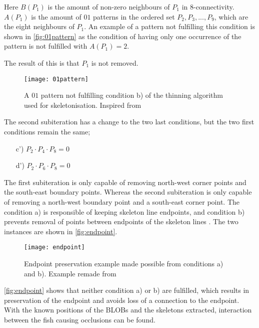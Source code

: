 Here $B(P_1)$ is the amount of non-zero neighbours of $P_1$ in 8-connectivity. $ A(P_1) $ is the amount of $01$ patterns in the ordered set $P_2, P_3, ... , P_9$, which are the eight neighbours of $P_1$. An example of a pattern not fulfilling this condition is shown in \autoref{fig:01pattern} as the condition of having only one occurrence of the pattern is not fulfilled with $A(P_1) = 2$.

The result of this is that $P_1$ is not removed.

\begin{figure}[H]
	\centering
	\texttt{[image: 01pattern]}
	\caption{A $01$ pattern not fulfilling condition b) of the thinning algorithm used for skeletonisation. Inspired from \cite{Zhang1984}}
	\label{fig:01pattern}
\end{figure}

The second subiteration has a change to the two last conditions, but the two first conditions remain the same;

\begin{itemize}
	\item[c')] $ P_2 \cdot P_4 \cdot P_8 = 0 $
	\item[d')] $ P_2 \cdot P_6 \cdot P_8 = 0 $
\end{itemize}

The first subiteration is only capable of removing north-west corner points and the south-east boundary points. Whereas the second subiteration is only capable of removing a north-west boundary point and a south-east corner point. The condition a) is responsible of keeping skeleton line endpoints, and condition b) prevents removal of points between endpoints of the skeleton lines \citep{Zhang1984}. The two instances are shown in \autoref{fig:endpoint}.

\begin{figure}[H]
	\centering
	\texttt{[image: endpoint]}
	\caption{Endpoint preservation example made possible from conditions a) and b). Example remade from \cite{Zhang1984}}
	\label{fig:endpoint}
\end{figure}

\autoref{fig:endpoint} shows that neither condition a) or b) are fulfilled, which results in preservation of the endpoint and avoids loss of a connection to the endpoint.\\

With the known positions of the BLOBs and the skeletons extracted, interaction between the fish causing occlusions can be found.
